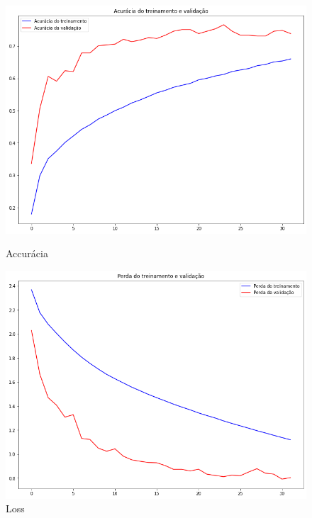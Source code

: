 \documentclass[12pt]{article}
\begin{document}
\begin{figure}[!htb]
  \begin{minipage}{.47\textwidth}
    \centering
    \includegraphics[width=1.1\linewidth]{experiments/lenet5_aug_32/accuracy.png}
    \caption{Accurácia}\label{fig:experiment_lenet5_aug_32_accuracy}
  \end{minipage}\hfill
  \begin{minipage}{.47\textwidth}
    \centering
    \includegraphics[width=1.1\linewidth]{experiments/lenet5_aug_32/loss.png}
    \caption{Loss}\label{fig:experiment_lenet5_aug_32_loss}
  \end{minipage}
\end{figure}
\end{document}
